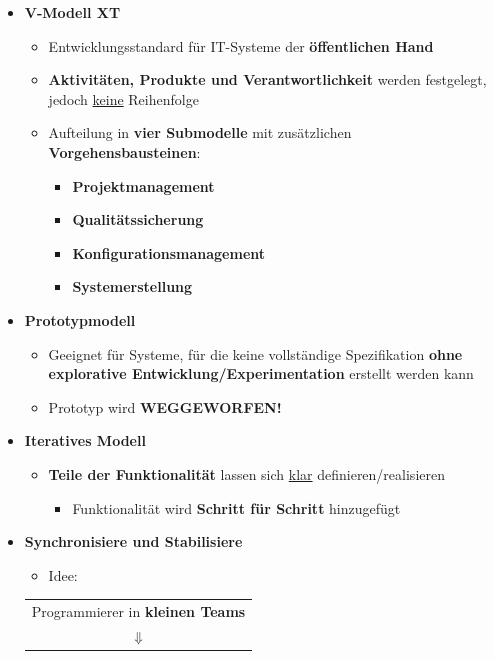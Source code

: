 	\newpage
	\begin{itemize}
		\item \textbf{V-Modell XT}
		\begin{itemize}
			\item Entwicklungsstandard für IT-Systeme der \textbf{öffentlichen Hand}
			\item \textbf{Aktivitäten, Produkte und Verantwortlichkeit} werden festgelegt, jedoch \underline{keine} Reihenfolge
			\item Aufteilung in \textbf{vier Submodelle} mit zusätzlichen \textbf{Vorgehensbausteinen}:
			\begin{itemize}
				\item \textbf{Projektmanagement}
				\item \textbf{Qualitätssicherung}
				\item \textbf{Konfigurationsmanagement}
				\item \textbf{Systemerstellung}
			\end{itemize}
		\end{itemize}
		\item \textbf{Prototypmodell}
		\begin{itemize}
			\item Geeignet für Systeme, für die keine vollständige Spezifikation \textbf{ohne explorative Entwicklung/Experimentation} erstellt werden kann
			\item Prototyp wird \textbf{WEGGEWORFEN!}
		\end{itemize}
		\item \textbf{Iteratives Modell}
		\begin{itemize}
			\item \textbf{Teile der Funktionalität} lassen sich \underline{klar} definieren/realisieren
			\begin{itemize}
				\item Funktionalität wird \textbf{Schritt für Schritt} hinzugefügt
			\end{itemize}
		\end{itemize}
		\item \textbf{Synchronisiere und Stabilisiere}
		\begin{itemize}
			\item Idee:
		\end{itemize}		
		\begin{center}
			\begin{tabular}{c}
				Programmierer in \textbf{kleinen Teams} \\
				$\Downarrow$ \\

\end{tabular}
\end{center}
\end{itemize}
